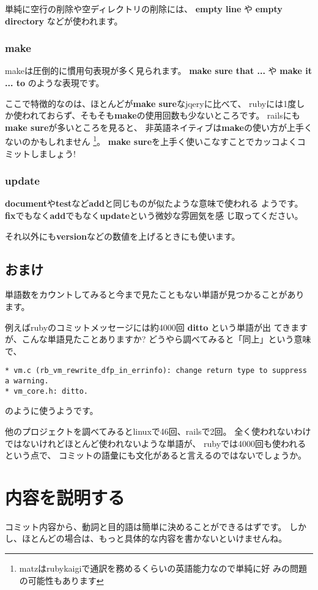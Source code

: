 \documentclass{jarticle}
\begin{document}
   単純に空行の削除や空ディレクトリの削除には、
   {\bf empty line} や {\bf empty directory} などが使われます。

   \subsubsection{make}
   makeは圧倒的に慣用句表現が多く見られます。
   {\bf make sure that ...} や {\bf make it ... to} のような表現です。

   ここで特徴的なのは、ほとんどが{\bf make sure}なjqeryに比べて、
   rubyには1度しか使われておらず、そもそも{\bf make}の使用回数も少ないところです。
   railsにも{\bf make sure}が多いところを見ると、
   非英語ネイティブは{\bf make}の使い方が上手くないのかもしれません
   \footnote{matzはrubykaigiで通訳を務めるくらいの英語能力なので単純に好
   みの問題の可能性もあります}。
   {\bf make sure}を上手く使いこなすことでカッコよくコミットしましょう!

   \subsubsection{update}
   {\bf document}や{\bf test}など{\bf add}と同じものが似たような意味で使われる
   ようです。
   {\bf fix}でもなく{\bf add}でもなく{\bf update}という微妙な雰囲気を感
   じ取ってください。

   それ以外にも{\bf version}などの数値を上げるときにも使います。

  \subsection{おまけ}
  単語数をカウントしてみると今まで見たこともない単語が見つかることがあり
  ます。

  例えばrubyのコミットメッセージには約4000回 {\bf ditto} という単語が出
  てきますが、こんな単語見たことありますか?
  どうやら調べてみると「同上」という意味で、
\begin{verbatim}
* vm.c (rb_vm_rewrite_dfp_in_errinfo): change return type to suppress a warning.
* vm_core.h: ditto.
\end{verbatim}
  のように使うようです。

  他のプロジェクトを調べてみるとlinuxで46回、railsで2回。
  全く使われないわけではないけれどほとんど使われないような単語が、
  rubyでは4000回も使われるという点で、
  コミットの語彙にも文化があると言えるのではないでしょうか。

 \section{内容を説明する}
 コミット内容から、動詞と目的語は簡単に決めることができるはずです。
 しかし、ほとんどの場合は、もっと具体的な内容を書かないといけませんね。
\end{document}

